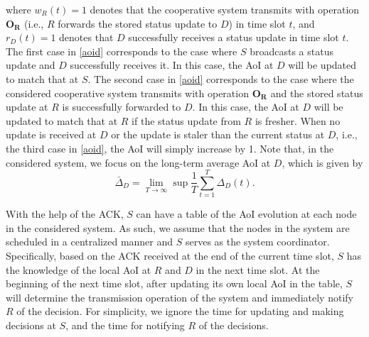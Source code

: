 \documentclass{IEEEtran}
\begin{document}
where $w_R(t)=1$ denotes that the cooperative system transmits with operation $\mathbf{O}_{\mathbf{R}}$ (i.e., $R$ forwards the stored status update to $D$) in time slot $t$, and $r_D(t)=1$ denotes that $D$ successfully receives a status update in time slot $t$. The first case in \eqref{aoid} corresponds to the case where $S$ broadcasts a status update and $D$ successfully receives it. In this case, the AoI at $D$ will be updated to match that at $S$. The second case in \eqref{aoid} corresponds to the case where the considered cooperative system transmits with operation $\mathbf{O}_{\mathbf{R}}$ and the stored status update at $R$ is successfully forwarded to $D$. In this case, the AoI at $D$ will be updated to match that at $R$ if the status update from $R$ is fresher. When no update is received at $D$ or the update is staler than the current status at $D$, i.e., the third case in \eqref{aoid}, the AoI will simply increase by 1. Note that, in the considered system, we focus on the long-term average AoI at $D$, which is given by
\begin{equation}
\bar{\Delta}_{D}=\lim\limits_{T \to \infty}\sup\frac{1}{T}\sum_{t=1}^{T}\Delta_{D}(t).
\end{equation}

 
With the help of the ACK, $S$ can have a table of the AoI evolution at each node in the considered system. As such, we assume that the nodes in the system are scheduled in a centralized manner and $S$ serves as the system coordinator. Specifically, based on the ACK received at the end of the current time slot, $S$ has the knowledge of the local AoI at $R$ and $D$ in the next time slot. At the beginning of the next time slot, after updating its own local AoI in the table, $S$ will determine the transmission operation of the system and immediately notify $R$ of the decision. For simplicity, we ignore the time for updating and making decisions at $S$, and the time for notifying $R$ of the decisions.
 
\end{document}
